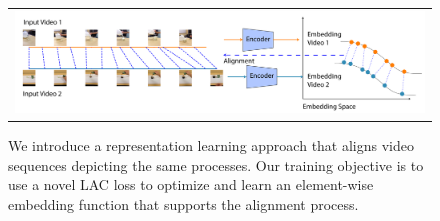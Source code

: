 \begin{figure}[t]
\begin{tabular}{c}
\includegraphics[width=\textwidth]{images/a1.png}
\end{tabular}
\caption{We introduce a representation learning approach that aligns video sequences depicting the same processes. Our training objective is to use a novel LAC loss to optimize and learn an element-wise embedding function that supports the alignment process.}
\label{fig: vis_intro}
\end{figure}
